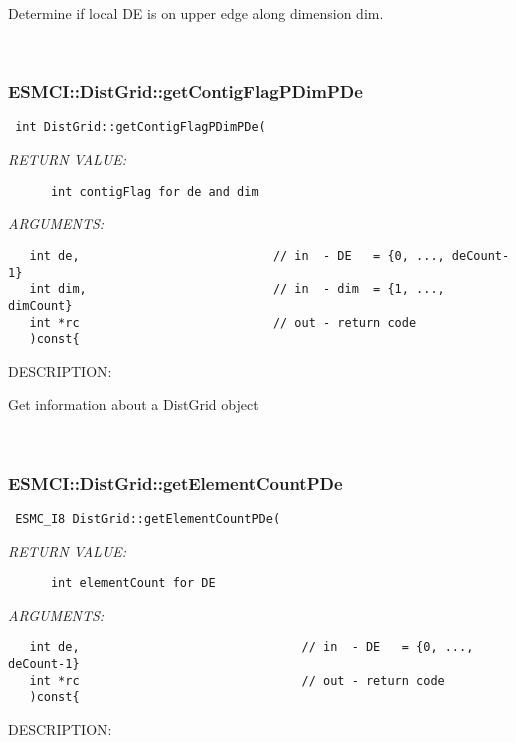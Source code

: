       Determine if local DE is on upper edge along dimension dim.
   
 
\mbox{}\hrulefill\
 
\subsubsection [ESMCI::DistGrid::getContigFlagPDimPDe] {ESMCI::DistGrid::getContigFlagPDimPDe}


  
\begin{verbatim} int DistGrid::getContigFlagPDimPDe(\end{verbatim}{\em RETURN VALUE:}
\begin{verbatim}      int contigFlag for de and dim\end{verbatim}{\em ARGUMENTS:}
\begin{verbatim}   int de,                           // in  - DE   = {0, ..., deCount-1}
   int dim,                          // in  - dim  = {1, ..., dimCount}
   int *rc                           // out - return code
   )const{\end{verbatim}
{\sf DESCRIPTION:\\ }


      Get information about a DistGrid object
   
 
\mbox{}\hrulefill\
 
\subsubsection [ESMCI::DistGrid::getElementCountPDe] {ESMCI::DistGrid::getElementCountPDe}


  
\begin{verbatim} ESMC_I8 DistGrid::getElementCountPDe(\end{verbatim}{\em RETURN VALUE:}
\begin{verbatim}      int elementCount for DE\end{verbatim}{\em ARGUMENTS:}
\begin{verbatim}   int de,                               // in  - DE   = {0, ..., deCount-1}
   int *rc                               // out - return code
   )const{\end{verbatim}
{\sf DESCRIPTION:\\ }



